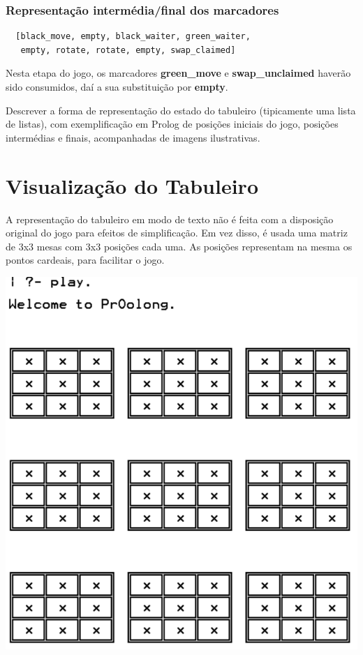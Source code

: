 \documentclass[a4paper]{article}
\begin{document}
\subsubsection{Representação intermédia/final dos marcadores}
\begin{lstlisting}
  [black_move, empty, black_waiter, green_waiter, 
   empty, rotate, rotate, empty, swap_claimed]
\end{lstlisting}

Nesta etapa do jogo, os marcadores \textbf{green\_move} e \textbf{swap\_unclaimed} haverão sido consumidos, daí a sua substituição por \textbf{empty}.

Descrever a forma de representação do estado do tabuleiro (tipicamente uma lista de listas), com exemplificação em Prolog de posições iniciais do jogo, posições intermédias e finais, acompanhadas de imagens ilustrativas. \newline


\section{Visualização do Tabuleiro}

A representação do tabuleiro em modo de texto não é feita com a disposição original do jogo para efeitos de simplificação. Em vez disso, é usada uma matriz de 3x3 mesas com 3x3 posições cada uma. As posições representam na mesma os pontos cardeais, para facilitar o jogo.

\begin{center}
\includegraphics[scale=0.33]{tabuleiro.png}
\end{center}
\end{document}

